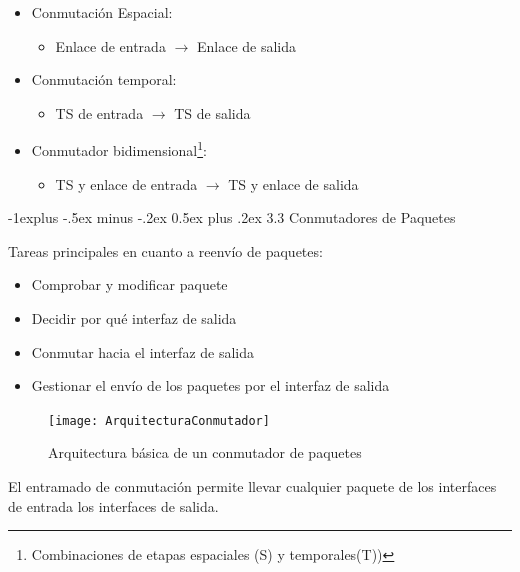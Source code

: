 \documentclass[10pt,portrait, twocolumn]{article}
\makeatletter
\renewcommand{\subsection}{\@startsection{subsection}{2}{0mm}%
                                {-1explus -.5ex minus -.2ex}%
                                {0.5ex plus .2ex}%
                                {\normalfont\normalsize\bfseries}}
\makeatother
\begin{document}
\begin{itemize}
\item Conmutación Espacial:
	\begin{itemize}
	\item Enlace de entrada  $\rightarrow$ Enlace de salida
	\end{itemize}
\item Conmutación temporal:
	\begin{itemize}
	\item TS de entrada $\rightarrow$ TS de salida
	\end{itemize}
\item Conmutador bidimensional\footnote{Combinaciones de etapas espaciales (S) y temporales(T))}:
	\begin{itemize}
	\item TS y enlace de entrada $\rightarrow$ TS y enlace de salida
	\end{itemize}
\end{itemize}

\subsection{3.3 Conmutadores de Paquetes}

Tareas principales en cuanto a reenvío de paquetes:

	\begin{itemize}
	\item Comprobar y modificar paquete
	\item Decidir por qué interfaz de salida
	\item Conmutar hacia el interfaz de salida
	\item Gestionar el envío de los paquetes por el interfaz de salida
	
	\end{itemize}

\begin{figure}[h]
	\centering
     \texttt{[image: ArquitecturaConmutador]}
      \caption{Arquitectura básica de un conmutador de paquetes}
      \label{fig:Matriz}
\end{figure}

El entramado de conmutación permite llevar cualquier paquete de los interfaces de entrada los interfaces de salida. 
\end{document}
